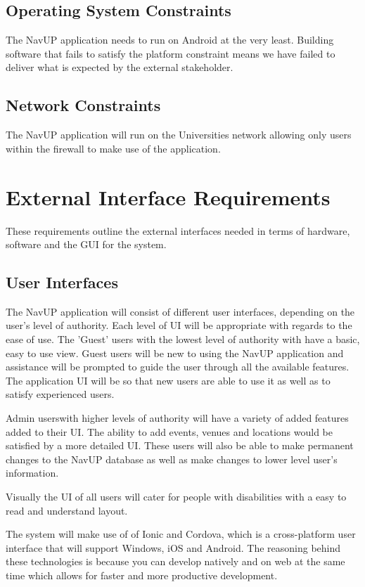 \documentclass{article}
\begin{document}
\subsection{Operating System Constraints}			   
 				The NavUP application needs to run on Android at the very least. Building software that fails to satisfy the platform constraint means we have failed to deliver what is expected by the external stakeholder. 
 				
 		\subsection{Network Constraints}			 
 				The NavUP application will run on the Universities network allowing only users within the firewall to make use of the application.
 				
 	\pagebreak
 	
	\section{External Interface Requirements}
	These requirements outline the external interfaces needed in terms of hardware, software and the GUI for the system.
	
	\subsection{User Interfaces}

The NavUP application will consist of different user interfaces, depending on the user's level of authority. Each level of UI will be appropriate with 
regards to the ease of use. The 'Guest' users with the lowest level of authority with have a basic, easy to use view. Guest users will be new to using
the NavUP application and assistance will be prompted to guide the user through all the available features. The application UI will be so that
new users are able to use it as well as to satisfy experienced users.


Admin userswith higher levels of authority will have a variety of added features added to their UI. The ability to add events, venues and
locations would be satisfied by a more detailed UI. These users will also be able to make permanent changes to the NavUP database as well as make changes
to lower level user's information.


Visually the UI of all users will cater for people with disabilities with a easy to read and understand layout. 

The system will make use of of Ionic and Cordova, which is a cross-platform user interface that will support Windows, iOS and Android. The reasoning behind these technologies is because you can develop natively and on web at the same time which allows for faster and more productive development.
\end{document}
